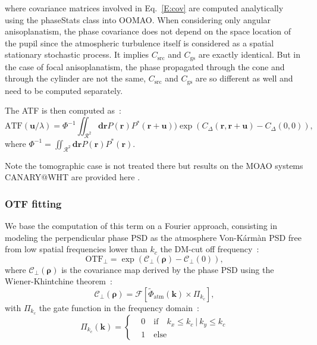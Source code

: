 \documentclass[12pt]{article}
\newcommand{\cro}[1]{\left[#1\right]}
\newcommand{\rbb}{\boldsymbol{r}}
\newcommand{\rhob}{\boldsymbol{\rho}}
\newcommand{\otf}[1]{\text{OTF}_{#1}}
\begin{document}
where covariance matrices involved in Eq.~\ref{E:cov} are computed analytically using the phaseStats class into OOMAO. When considering only angular anisoplanatism, the phase covariance does not depend on the space location of the pupil since the atmospheric turbulence itself is considered as a spatial stationary stochastic process. It implies $C_\text{src}$ and $C_\text{gs}$ are exactly identical.
But in the case of focal anisoplanatism, the phase propagated through the cone and through the cylinder are not the same, $C_\text{src}$ and $C_\text{gs}$ are so different as well and need to be computed separately.

The ATF is then computed as~:
\begin{equation}
\text{ATF}(\boldsymbol{u}/\lambda) = \Phi^{-1}\iint_{\mathcal{R}^2}\boldsymbol{d}\rbb P(\rbb)P^\ast(\rbb+ \boldsymbol{u}))\exp(C_\Delta(\rbb,\rbb + \boldsymbol{u}) - C_\Delta(0,0) ),
\end{equation}
where $\Phi^{-1} = \iint_{\mathcal{R}^2}\boldsymbol{d}\rbb P(\rbb)P^\ast(\rbb)$.

Note the tomographic case is not treated there but results on the MOAO systems CANARY@WHT are provided here \cite{Martin2016JATIS}.
\subsubsection{OTF fitting}
We base the computation of this term on a Fourier approach, consisting in modeling the perpendicular phase PSD as the atmosphere Von-K\'arm\`an PSD free from low spatial frequencies lower than $k_c$ the DM-cut off frequency~:
\begin{equation}
\otf{\perp} = \exp(\mathcal{C}_{\perp}(\rhob) - \mathcal{C}_{\perp}(0) ),
\end{equation}
where $	\mathcal{C}_{\perp}(\rhob)$ is the covariance map derived by the phase PSD using the Wiener-Khintchine theorem~:
\begin{equation}
\mathcal{C}_{\perp}(\rhob) = \mathcal{F}\cro{\tilde{\Phi}_\text{atm}(\boldsymbol{k})\times {\Pi}_{k_c} },
\end{equation}
with ${\Pi}_{k_c}$ the gate function in the frequency domain~:
\begin{equation}
{\Pi}_{k_c}(\boldsymbol{k}) = \left\lbrace 
\begin{aligned}
& 0\quad \text{if}\quad k_x \leq k_c \: | \: k_y \leq k_c\\
& 1\quad \text{else}
\end{aligned}
\right.
\end{equation}
\end{document}
